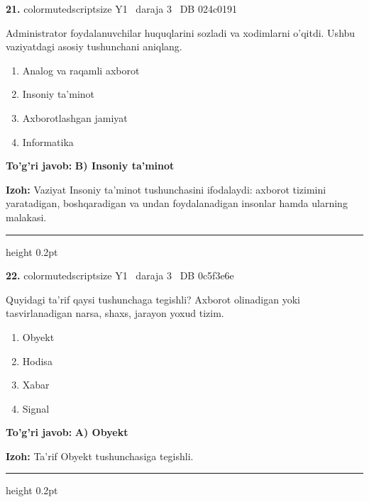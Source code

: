 \documentclass[10pt,a4paper,oneside]{article}
\begin{document}
\noindent\textbf{\color{ink}21.}  {color{muted}scriptsize Y1 \textbullet\ daraja 3 \textbullet\ DB 024c0191}
\par
Administrator foydalanuvchilar huquqlarini sozladi va xodimlarni o'qitdi. Ushbu vaziyatdagi asosiy tushunchani aniqlang.
\begin{enumerate}[label=\Alph*),leftmargin=9mm]
\item Analog va raqamli axborot
\item Insoniy ta'minot
\item Axborotlashgan jamiyat
\item Informatika
\end{enumerate}
\begin{tcolorbox}[enhanced,breakable,colback=teal!4,colframe=teal!50!black,boxrule=0.5pt,arc=1.1mm,left=3mm,right=3mm,top=1.7mm,bottom=1.7mm,before skip=2mm,after skip=2mm]
\textbf{\color{teal}To'g'ri javob:} \textbf{B) Insoniy ta'minot}
\par\smallskip
\textbf{Izoh:} Vaziyat Insoniy ta'minot tushunchasini ifodalaydi: axborot tizimini yaratadigan, boshqaradigan va undan foydalanadigan insonlar hamda ularning malakasi.
\end{tcolorbox}
\vspace{2mm}\hrule height 0.2pt \vspace{3mm}

\noindent\textbf{\color{ink}22.}  {color{muted}scriptsize Y1 \textbullet\ daraja 3 \textbullet\ DB 0c5f3e6e}
\par
Quyidagi ta'rif qaysi tushunchaga tegishli? Axborot olinadigan yoki tasvirlanadigan narsa, shaxs, jarayon yoxud tizim.
\begin{enumerate}[label=\Alph*),leftmargin=9mm]
\item Obyekt
\item Hodisa
\item Xabar
\item Signal
\end{enumerate}
\begin{tcolorbox}[enhanced,breakable,colback=teal!4,colframe=teal!50!black,boxrule=0.5pt,arc=1.1mm,left=3mm,right=3mm,top=1.7mm,bottom=1.7mm,before skip=2mm,after skip=2mm]
\textbf{\color{teal}To'g'ri javob:} \textbf{A) Obyekt}
\par\smallskip
\textbf{Izoh:} Ta'rif Obyekt tushunchasiga tegishli.
\end{tcolorbox}
\vspace{2mm}\hrule height 0.2pt \vspace{3mm}
\end{document}
